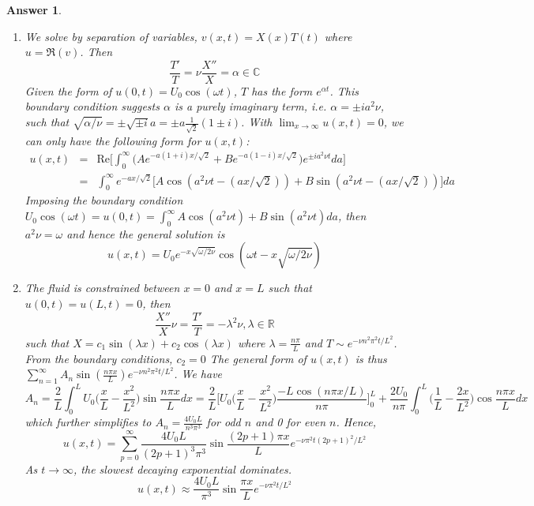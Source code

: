 \documentclass[a4paper]{article}
\newtheorem{ans}{Answer}[section]
\theoremstyle{new}
\begin{document}
\begin{ans}\leavevmode
\begin{enumerate}[label=(\roman*)]
    \item We solve by separation of variables, $v(x,t)=X(x)T(t)$ where $u=\Re(v)$. Then $$\frac{T'}{T}=\nu\frac{X''}{X}=\alpha\in\mathbb{C}$$
Given the form of $u(0,t)=U_0\cos(\omega t)$, $T$ has the form $e^{\alpha t}$. This boundary condition suggests $\alpha$ is a purely imaginary term, i.e. $\alpha=\pm ia^2\nu$, such that $\sqrt{\alpha/\nu}=\pm\sqrt{\pm i}a=\pm a\frac{1}{\sqrt{2}}(1\pm i)$. With $\lim_{x\rightarrow\infty}u(x,t)=0$, we can only have the following form for $u(x,t)$:
\begin{eqnarray}
u(x,t)&=&\text{Re}\bigg[\int_0^\infty\bigg(Ae^{-a(1+i)x/\sqrt{2}}+Be^{-a(1-i)x/\sqrt{2}}\bigg)e^{\pm ia^2\nu t}da\bigg]\nonumber\\&=&\int_0^\infty e^{-ax/\sqrt{2}}\bigg[A\cos(a^2\nu t-(ax/\sqrt{2}))+B\sin(a^2\nu t-(ax/\sqrt{2}))\bigg]da\nonumber
\end{eqnarray}
Imposing the boundary condition $U_0\cos(\omega t)=u(0,t)=\int_0^\infty A\cos(a^2\nu t)+B\sin(a^2\nu t)da$, then $a^2\nu=\omega$ and hence the general solution is
$$u(x,t)=U_0e^{-x\sqrt{\omega/2\nu}}\cos(\omega t-x\sqrt{\omega/2\nu})$$
\item  The fluid is constrained between $x=0$ and $x=L$ such that $u(0,t)=u(L,t)=0$, then
$$\frac{X''}{X}\nu=\frac{T'}{T}=-\lambda^2\nu,\lambda\in\mathbb{R}$$
such that $X=c_1\sin(\lambda x)+c_2\cos(\lambda x)$ where $\lambda=\frac{n\pi}{L}$ and $T\sim e^{-\nu n^2\pi^2t/L^2}$. From the boundary conditions, $c_2=0$  The general form of $u(x,t)$ is thus $\sum_{n=1}^\infty A_n\sin(\frac{n\pi x}{L})e^{-\nu n^2\pi^2t/L^2}$. We have
$$A_n=\frac{2}{L}\int_0^LU_0\bigg(\frac{x}{L}-\frac{x^2}{L^2}\bigg)\sin\frac{n\pi x}{L}dx=\frac{2}{L}\bigg[U_0\bigg(\frac{x}{L}-\frac{x^2}{L^2}\bigg)\frac{-L\cos(n\pi x/L)}{n\pi}\bigg]_0^L+\frac{2U_0}{n\pi}\int_0^L\bigg(\frac{1}{L}-\frac{2x}{L^2}\bigg)\cos\frac{n\pi x}{L}dx$$
which further simplifies to $A_n=\frac{4U_0L}{n^3\pi^3}$ for odd $n$ and 0 for even $n$. Hence,
$$u(x,t)=\sum_{p=0}^\infty\frac{4U_0L}{(2p+1)^3\pi^3}\sin\frac{(2p+1)\pi x}{L}e^{-\nu\pi^2t(2p+1)^2/L^2}$$
As $t\rightarrow\infty$, the slowest decaying exponential dominates.
$$u(x,t)\approx\frac{4U_0L}{\pi^3}\sin\frac{\pi x}{L}e^{-\nu\pi^2t/L^2}$$
\end{enumerate}
\end{ans}
\newpage
\end{document}
